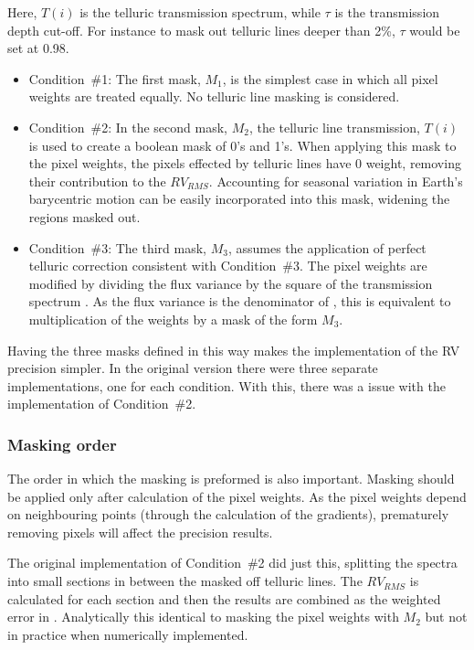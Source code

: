 Here, \(T(i)\) is the telluric transmission spectrum, while \(\tau\) is the transmission depth cut-off. For instance to mask out telluric lines deeper than 2\%,  \(\tau\) would be set at 0.98.

\begin{itemize}
    \item Condition~\#1:
    The first mask, \(M_1\), is the simplest case in which all pixel weights are treated equally. No telluric line masking is considered.

    \item Condition~\#2:
    In the second mask, \(M_2\), the telluric line transmission, \(T(i)\) is used to create a boolean mask of 0's and 1's. When applying this mask to the pixel weights, the pixels effected by telluric lines have 0 weight, removing their contribution to the {\red{} \(RV_{RMS}\)}. Accounting for seasonal variation in Earth's barycentric motion can be easily incorporated into this mask, widening the regions masked out.

    \item Condition~\#3:
    The third mask, \(M_3\), assumes the application of perfect telluric correction consistent with Condition~\#3. The pixel weights are modified by dividing the flux variance by the square of the transmission spectrum . As the flux variance is the denominator of , this is equivalent to multiplication of the weights by a mask of the form \(M_3\).
\end{itemize}

Having the three masks defined in this way makes the implementation of the {RV} precision simpler. In the original version there were three separate implementations, one for each condition. With this,  there was a issue with the implementation of Condition~\#2.

\subsubsection{Masking order}
\label{subsubsec:masking_order}
The order in which the masking is preformed is also important. Masking should be applied only after calculation of the pixel weights. As the pixel weights depend on neighbouring points (through the calculation of the gradients), prematurely removing pixels will affect the precision results.

The original implementation of Condition~\#2 did just this, splitting the spectra into small sections in between the masked off telluric lines. The {\red{}\(RV_{RMS}\)} is calculated for each section and then the results are combined as the weighted error in {\red{} } . Analytically this identical to masking the pixel weights with \(M_2\) but not in practice when numerically implemented. 

